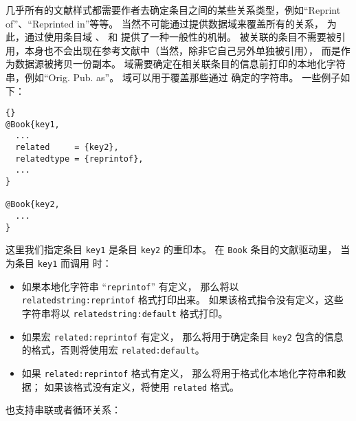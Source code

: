 几乎所有的文献样式都需要作者去确定条目之间的某些关系类型，例如“Reprint of”、“Reprinted in”等等。
当然不可能通过提供数据域来覆盖所有的关系，
为此，\biblatex 通过使用条目域 、 和  提供了一种一般性的机制。
被关联的条目不需要被引用，本身也不会出现在参考文献中（当然，除非它自己另外单独被引用），
而是作为数据源被拷贝一份副本。
 域需要确定在相关联条目的信息前打印的本地化字符串，例如“Orig. Pub. as”。
 域可以用于覆盖那些通过  确定的字符串。
一些例子如下：

\begin{lstlisting}[style=bibtex]{}
@Book{key1,
  ...
  related     = {key2},
  relatedtype = {reprintof},
  ...
}

@Book{key2,
  ...
}
\end{lstlisting}
%
这里我们指定条目 \texttt{key1} 是条目 \texttt{key2} 的重印本。
在 \texttt{Book} 条目的文献驱动里，
当为条目 \texttt{key1} 而调用  时：

\begin{itemize}
\item %
如果本地化字符串 “\texttt{reprintof}” 有定义，
那么将以 \texttt{relatedstring:reprintof} 格式打印出来。
如果该格式指令没有定义，这些字符串将以 \texttt{relatedstring:default} 格式打印。
\item %
如果宏 \texttt{related:reprintof} 有定义，
那么将用于确定条目 \texttt{key2} 包含的信息的格式，否则将使用宏 \texttt{related:default}。
\item %
如果 \texttt{related:reprintof} 格式有定义，
那么将用于格式化本地化字符串和数据；
如果该格式没有定义，将使用 \texttt{related} 格式。
\end{itemize}
%
也支持串联或者循环关系：

